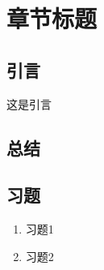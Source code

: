 \specialsectioning
\chapter{章节标题}
\label{chap:intro}

\section{引言}
\renewcommand\specialsectioning{\setcounter{secnumdepth}{2}} %
\specialsectioning
\renewcommand\sectionmark[1]{\markright{\thesection  #1}{}}

这是引言





\section{总结}
\label{xj_ch2}


\section{习题}

\begin{enumerate}
	\item {习题1}
	\item {习题2}

\end{enumerate}


